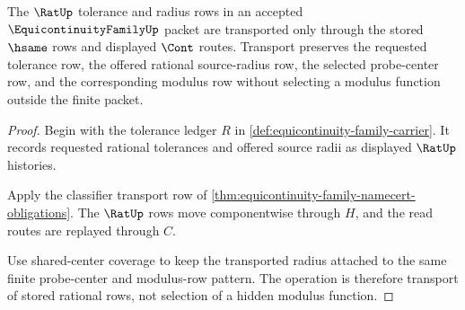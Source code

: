 \begin{theorem}
\label{thm:equicontinuity-family-rational-radius-transport}
The $\RatUp$ tolerance and radius rows in an accepted $\EquicontinuityFamilyUp$ packet are transported only through the stored $\hsame$ rows and displayed $\Cont$ routes. Transport preserves the requested tolerance row, the offered rational source-radius row, the selected probe-center row, and the corresponding modulus row without selecting a modulus function outside the finite packet.
\end{theorem}
\begin{proof}
Begin with the tolerance ledger $R$ in \autoref{def:equicontinuity-family-carrier}. It records requested rational tolerances and offered source radii as displayed $\RatUp$ histories.

Apply the classifier transport row of \autoref{thm:equicontinuity-family-namecert-obligations}. The $\RatUp$ rows move componentwise through $H$, and the read routes are replayed through $C$.

Use shared-center coverage to keep the transported radius attached to the same finite probe-center and modulus-row pattern. The operation is therefore transport of stored rational rows, not selection of a hidden modulus function.
\end{proof}

